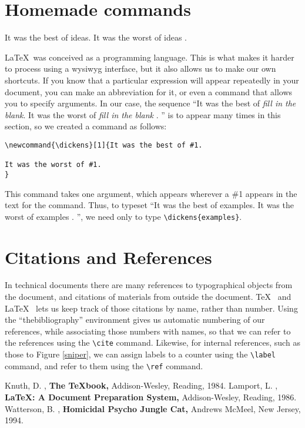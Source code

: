 \documentclass[12pt]{article}
\begin{document}
\section{Homemade commands}
\newcommand{\dickens}[1]{It was the best of #1.
It was the worst of #1
.
}
\dickens{ideas}
\LaTeX\ was conceived as a programming language.
This is what makes it
harder to process using a wysiwyg interface, but it also allows
us to make our own shortcuts.
If you know that a particular expression will appear repeatedly
in your document, you can make an abbreviation for it, or even
a command that allows you to specify arguments.
In our case,
the sequence ``\dickens{{\it fill in the blank}}''
is to appear many times in this section, so we created a command
as follows:
\begin{verbatim}
\newcommand{\dickens}[1]{It was the best of #1.

It was the worst of #1.
}
\end{verbatim}
This command takes one argument, which appears wherever a \#1 appears
in the text for the command.
Thus, to typeset ``\dickens{examples}'',
we need only to type \verb(\dickens{examples}(.

\section{Citations and References}
In technical documents there are many references to 
typographical objects from the document, and citations
of materials from outside the document.
\TeX\ \cite{knuth}
and \LaTeX\ \cite{lamport} lets us keep track of those citations
by name, rather than number.
Using the ``thebibliography'' 
environment gives us automatic numbering of our references,
while associating those numbers with names, so that we can
refer to the references using the \verb(\cite( command.
Likewise, for internal references, such as those to Figure \ref{sniper},
we can assign labels to a counter using the \verb(\label(
command, and refer to them using the \verb(\ref( command.

\begin{thebibliography}{X}
     Knuth, D.
    , {\bf The \TeX book,} Addison-Wesley, Reading, 1984.
     Lamport, L.
    , {\bf \LaTeX: A Document Preparation System,}
    Addison-Wesley, Reading, 1986.
     Watterson, B.
    , {\bf Homicidal Psycho Jungle Cat,}
    Andrews McMeel, New Jersey, 1994.
\end{thebibliography}
\end{document}
